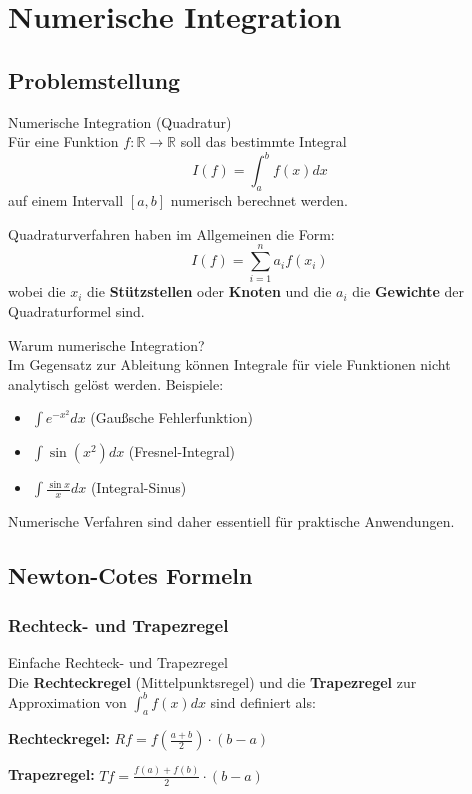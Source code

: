 \section{Numerische Integration}

\subsection{Problemstellung}

\begin{definition}{Numerische Integration (Quadratur)}\\
Für eine Funktion $f: \mathbb{R} \rightarrow \mathbb{R}$ soll das bestimmte Integral
$$I(f) = \int_a^b f(x) dx$$
auf einem Intervall $[a,b]$ numerisch berechnet werden.

Quadraturverfahren haben im Allgemeinen die Form:
$$I(f) = \sum_{i=1}^{n} a_i f(x_i)$$
wobei die $x_i$ die \textbf{Stützstellen} oder \textbf{Knoten} und die $a_i$ die \textbf{Gewichte} der Quadraturformel sind.
\end{definition}

\begin{concept}{Warum numerische Integration?}\\
Im Gegensatz zur Ableitung können Integrale für viele Funktionen nicht analytisch gelöst werden. Beispiele:
\begin{itemize}
    \item $\int e^{-x^2} dx$ (Gaußsche Fehlerfunktion)
    \item $\int \sin(x^2) dx$ (Fresnel-Integral)
    \item $\int \frac{\sin x}{x} dx$ (Integral-Sinus)
\end{itemize}
Numerische Verfahren sind daher essentiell für praktische Anwendungen.
\end{concept}

\subsection{Newton-Cotes Formeln}

\subsubsection{Rechteck- und Trapezregel}

\begin{definition}{Einfache Rechteck- und Trapezregel}\\
Die \textbf{Rechteckregel} (Mittelpunktsregel) und die \textbf{Trapezregel} zur Approximation von $\int_a^b f(x) dx$ sind definiert als:

\textbf{Rechteckregel:} $Rf = f\left(\frac{a+b}{2}\right) \cdot (b-a)$

\textbf{Trapezregel:} $Tf = \frac{f(a) + f(b)}{2} \cdot (b-a)$
\end{definition}

